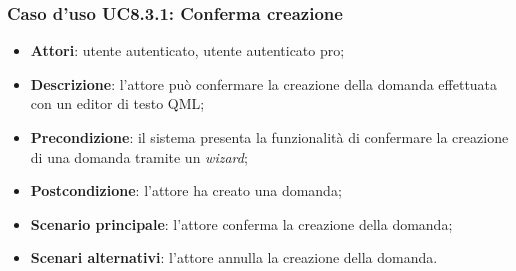 		\subsubsection{Caso d'uso UC8.3.1: Conferma creazione}
		\begin{itemize}
			\item
			\textbf{Attori}: utente autenticato, utente autenticato pro;
			\item
			\textbf{Descrizione}: l'attore può confermare la creazione della domanda effettuata con un editor di testo QML;
			\item		
			\textbf{Precondizione}: il sistema presenta la funzionalità di confermare la creazione di una domanda tramite un \textit{wizard};
			\item
			\textbf{Postcondizione}: l'attore ha creato una domanda;
			\item
			\textbf{Scenario principale}: l'attore conferma la creazione della domanda;		
			\item
			\textbf{Scenari alternativi}: l'attore annulla la creazione della domanda.	
		\end{itemize}
	
